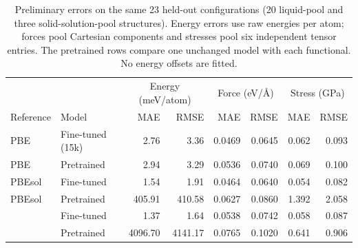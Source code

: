 \begin{table}[t]
\caption{Preliminary errors on the same 23 held-out configurations (20 liquid-pool and three solid-solution-pool structures). Energy errors use raw energies per atom; forces pool Cartesian components and stresses pool six independent tensor entries. The pretrained rows compare one unchanged model with each functional. No energy offsets are fitted.}
\label{tab:fit}
\begin{ruledtabular}
\begin{tabular}{llrrrrrr}
 & & \multicolumn{2}{c}{Energy (meV/atom)} & \multicolumn{2}{c}{Force (eV/\AA)} & \multicolumn{2}{c}{Stress (GPa)} \\
Reference & Model & MAE & RMSE & MAE & RMSE & MAE & RMSE \\
\hline
PBE & Fine-tuned (15k) & 2.76 & 3.36 & 0.0469 & 0.0645 & 0.062 & 0.093 \\
PBE & Pretrained & 2.94 & 3.29 & 0.0536 & 0.0740 & 0.069 & 0.100 \\
PBEsol & Fine-tuned & 1.54 & 1.91 & 0.0464 & 0.0640 & 0.054 & 0.082 \\
PBEsol & Pretrained & 405.91 & 410.58 & 0.0627 & 0.0860 & 1.392 & 2.058 \\
\rscan{} & Fine-tuned & 1.37 & 1.64 & 0.0538 & 0.0742 & 0.058 & 0.087 \\
\rscan{} & Pretrained & 4096.70 & 4141.17 & 0.0765 & 0.1020 & 0.641 & 0.906 \\
\end{tabular}
\end{ruledtabular}
\end{table}
